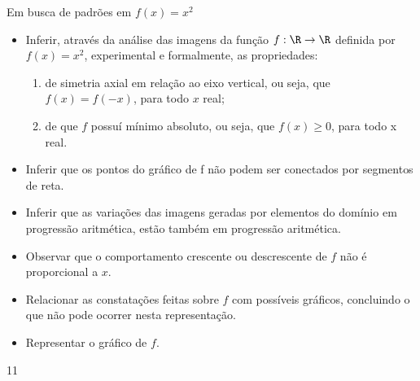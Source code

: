\cleardoublepage
\def\currentcolor{session1}
\begin{objectives}{Em busca de padrões em \(f(x)=x^2\)}
{
\begin{itemize}[itemsep=0pt]
\item Inferir, através da análise das imagens da função $f:\R\to\R$ definida por $f(x)=x^2$, experimental e formalmente, as propriedades:

\begin{enumerate}[leftmargin=10pt]
\item de simetria axial em relação ao eixo vertical, ou seja, que $f(x)=f(−x)$, para todo $x$ real;

\item de que $f$ possuí mínimo absoluto, ou seja, que $f(x)\geq0$, para todo x real.
\end{enumerate}

\item Inferir que os pontos do gráfico de f não podem ser conectados por segmentos de reta.

\item Inferir que as variações das imagens geradas por elementos do domínio em progressão aritmética, estão também em progressão aritmética.

\item Observar que o comportamento crescente ou descrescente de $f$ não é proporcional a $x$.

\item Relacionar as constatações feitas sobre $f$ com possíveis gráficos, concluindo o que não pode ocorrer nesta representação.

\item Representar o gráfico de $f$.
\end{itemize}
}{1}{1}
\end{objectives}

